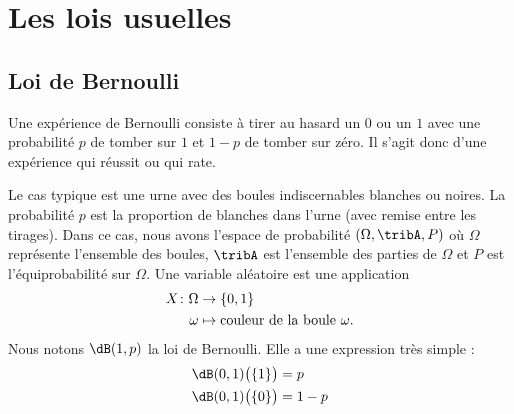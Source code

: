
\section{Les lois usuelles}

\subsection{Loi de Bernoulli}

Une expérience de Bernoulli consiste à tirer au hasard un \( 0\) ou un \( 1\) avec une probabilité \( p\) de tomber sur \( 1\) et \( 1-p\) de tomber sur zéro. Il s'agit donc d'une expérience qui réussit ou qui rate.

Le cas typique est une urne avec des boules indiscernables blanches ou noires. La probabilité \( p\) est la proportion de blanches dans l'urne (avec remise entre les tirages). Dans ce cas, nous avons l'espace de probabilité \( (\Omega,\tribA,P)\) où \( \Omega\) représente l'ensemble des boules, \( \tribA\) est l'ensemble des parties de \( \Omega\) et \( P\) est l'équiprobabilité sur \( \Omega\). Une variable aléatoire est une application
\begin{equation}
    \begin{aligned}
        X\colon \Omega&\to \{ 0,1 \} \\
        \omega&\mapsto \text{couleur de la boule \( \omega\)}.
    \end{aligned}
\end{equation}
Nous notons \( \dB(1,p)\) la loi de Bernoulli. Elle a une expression très simple :
\begin{subequations}
    \begin{align}
        \dB(0,1)\big( \{ 1 \} \big)&=p\\
        \dB(0,1)\big( \{ 0 \} \big)&=1-p
    \end{align}
\end{subequations}

